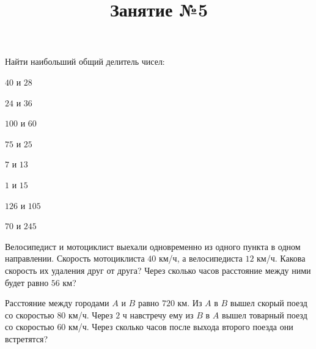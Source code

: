 \begin{listofex}
	\item Найти наибольший общий делитель чисел:
	\begin{enumcols}[itemcolumns=4]
		\item \( 40 \) и \( 28 \)
		\item \( 24 \) и \( 36 \)
		\item \( 100 \) и \( 60 \)
		\item \( 75 \) и \( 25 \)
		\item \( 7 \) и \( 13 \)
		\item \( 1 \) и \( 15 \)
		\item \( 126 \) и \( 105 \)
		\item \( 70 \) и \( 245 \)
	\end{enumcols}
	\item Велосипедист и мотоциклист выехали одновременно из одного пункта в одном направлении. Скорость мотоциклиста \( 40 \) км/ч, а велосипедиста \( 12 \) км/ч. Какова скорость их удаления друг от друга? Через сколько часов расстояние между ними будет равно \( 56 \) км?
	\item Расстояние между городами \( A \) и \( B \) равно \( 720 \) км. Из \( A \) в \( B \) вышел скорый поезд со скоростью \( 80 \) км/ч. Через \( 2 \) ч навстречу ему из \( B \) в \( A \) вышел товарный поезд со скоростью \( 60 \) км/ч. Через сколько часов после выхода второго поезда они встретятся?
\end{listofex}
\newpage
\title{Занятие №5}
